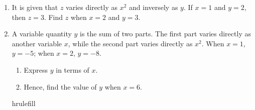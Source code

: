\documentclass[11pt]{article}
\begin{document}
\begin{enumerate}
            \hrulefill
            
            \hrulefill

        \item It is given that $z$ varies directly as $x^2$ and inversely as $y$. If $x=1$ and $y=2$, then $z=3$. Find $z$ when $x=2$ and $y=3$.
        
        \hrulefill

            \hrulefill
            
            \hrulefill
            
            \hrulefill
            
            \hrulefill
            
            \hrulefill
            
            \hrulefill
            
            \hrulefill
            
            \hrulefill
            
            \hrulefill
            
            \hrulefill
            
            \hrulefill

        \pagebreak
        \item A variable quantity $y$ is the sum of two parts. The first part varies directly as another variable $x$, while the second part varies directly as $x^2$. When $x=1$, $y=-5$; when $x=2$, $y=-8$.\begin{enumerate}
            \item Express $y$ in terms of $x$.
            \item Hence, find the value of $y$ when $x=6$.
        \end{enumerate}

        hrulefill

            \hrulefill
            
            \hrulefill
            
            \hrulefill
            
            \hrulefill
            
            \hrulefill
            
            \hrulefill
            
            \hrulefill
            
            \hrulefill
            
            \hrulefill
            

\end{enumerate}
\end{document}
